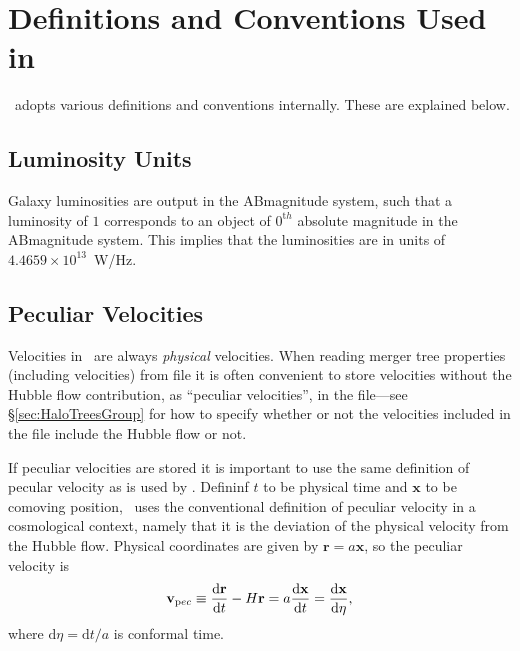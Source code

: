 \chapter{Definitions and Conventions Used in \glc}

\glc\ adopts various definitions and conventions internally. These are explained below.

\section{Luminosity Units}

Galaxy luminosities are output in the \gls{ABmagnitude} system, such that a luminosity of $1$ corresponds to an object of $0^{\mathrm th}$ absolute magnitude in the \gls{ABmagnitude} system. This implies that the luminosities are in units of $4.4659\times 10^{13}$~W/Hz.

\section{Peculiar Velocities}\label{sec:GalacticusVelocityDefinitions}

Velocities in \glc\ are always \emph{physical} velocities. When reading merger tree properties (including velocities) from file it is often convenient to store velocities without the Hubble flow contribution, as ``peculiar velocities'', in the file---see \S\ref{sec:HaloTreesGroup} for how to specify whether or not  the velocities included in the file include the Hubble flow or not.

If peculiar velocities are stored it is important to use the same definition of pecular velocity as is used by \glc. Defininf $t$ to be physical time and ${\mathbf x}$ to be comoving position, \glc\ uses the conventional definition of peculiar velocity in a cosmological context, namely that it is the deviation of the physical velocity from the Hubble flow. Physical coordinates are given by ${\mathbf r} = a{\mathbf x}$, so the peculiar velocity is
\begin{equation}
{\mathbf v}_{\mathrm pec} \equiv {{\mathrm d} {\mathbf r} \over {\mathrm d} t} - H {\mathbf r} = a {{\mathrm d} {\mathbf x}\over{\mathrm d} t} = {{\mathrm d}{\mathbf x}\over{\mathrm d}\eta},
\end{equation}
where ${\mathrm d}\eta = {\mathrm d}t/a$ is conformal time. 
